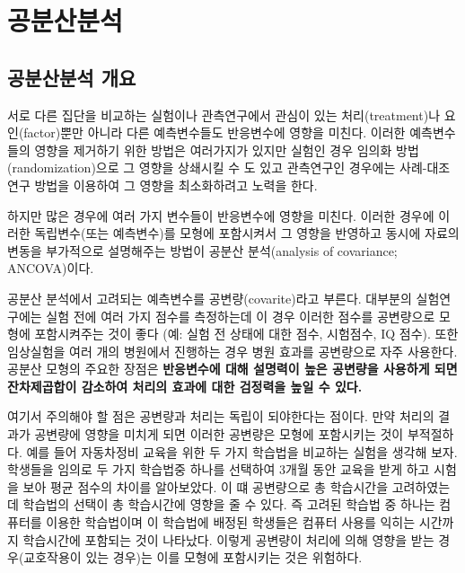 \documentclass[
  10pt,
]{book}
\theoremstyle{definition}
\theoremstyle{definition}
\theoremstyle{definition}
\theoremstyle{definition}
\theoremstyle{remark}
\begin{document}
\hypertarget{ancova}{%
\chapter{공분산분석}\label{ancova}}

\hypertarget{uxacf5uxbd84uxc0b0uxbd84uxc11d-uxac1cuxc694}{%
\section{공분산분석 개요}\label{uxacf5uxbd84uxc0b0uxbd84uxc11d-uxac1cuxc694}}

서로 다른 집단을 비교하는 실험이나 관측연구에서 관심이 있는 처리(treatment)나 요인(factor)뿐만 아니라 다른 예측변수들도 반응변수에 영향을 미친다. 이러한 예측변수들의 영향을 제거하기 위한 방법은 여러가지가 있지만 실험인 경우 임의화 방법(randomization)으로 그 영향을 상쇄시킬 수 도 있고 관측연구인 경우에는 사례-대조연구 방법을 이용하여 그 영향을 최소화하려고 노력을 한다.

하지만 많은 경우에 여러 가지 변수들이 반응변수에 영향을 미친다. 이러한 경우에 이러한 독립변수(또는 예측변수)를 모형에 포함시켜서 그 영향을 반영하고 동시에 자료의 변동을 부가적으로 설명해주는 방법이 공분산 분석(analysis of covariance; ANCOVA)이다.

공분산 분석에서 고려되는 예측변수를 공변량(covarite)라고 부른다.
대부분의 실험연구에는 실험 전에 여러 가지 점수를 측정하는데 이 경우 이러한 점수를 공변량으로 모형에 포함시켜주는 것이 좋다 (예: 실험 전 상태에 대한 점수, 시험점수, IQ 점수). 또한 임상실험을 여러 개의 병원에서 진행하는 경우 병원 효과를 공변량으로 자주 사용한다.\\
공분산 모형의 주요한 장점은 \textbf{반응변수에 대해 설명력이 높은 공변량을 사용하게 되면 잔차제곱합이 감소하여 처리의 효과에 대한 검정력을 높일 수 있다.}

여기서 주의해야 할 점은 공변량과 처리는 독립이 되야한다는 점이다. 만약 처리의 결과가 공변량에 영향을 미치게 되면 이러한 공변량은 모형에 포함시키는 것이 부적절하다. 예를 들어 자동차정비 교육을 위한 두 가지 학습법을 비교하는 실험을 생각해 보자. 학생들을 임의로 두 가지 학습법중 하나를 선택하여 3개월 동안 교육을 받게 하고 시험을 보아 평균 점수의 차이를 알아보았다. 이 떄 공변량으로 총 학습시간을 고려하였는데 학습법의 선택이 총 학습시간에 영향을 줄 수 있다. 즉 고려된 학습법 중 하나는 컴퓨터를 이용한 학습법이며 이 학습법에 배정된 학생들은 컴퓨터 사용를 익히는 시간까지 학습시간에 포함되는 것이 나타났다. 이렇게 공변량이 처리에 의해 영향을 받는 경우(교호작용이 있는 경우)는 이를 모형에 포함시키는 것은 위험하다.
\end{document}
